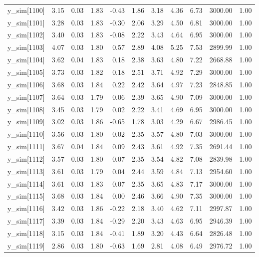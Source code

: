 \begin{table}[ht]
\begin{tabular}{rrrrrrrrrrr}
  y\_sim[1100] & 3.15 & 0.03 & 1.83 & -0.43 & 1.86 & 3.18 & 4.36 & 6.73 & 3000.00 & 1.00 \\ 
  y\_sim[1101] & 3.28 & 0.03 & 1.83 & -0.30 & 2.06 & 3.29 & 4.50 & 6.81 & 3000.00 & 1.00 \\ 
  y\_sim[1102] & 3.40 & 0.03 & 1.83 & -0.08 & 2.22 & 3.43 & 4.64 & 6.95 & 3000.00 & 1.00 \\ 
  y\_sim[1103] & 4.07 & 0.03 & 1.80 & 0.57 & 2.89 & 4.08 & 5.25 & 7.53 & 2899.99 & 1.00 \\ 
  y\_sim[1104] & 3.62 & 0.04 & 1.83 & 0.18 & 2.38 & 3.63 & 4.80 & 7.22 & 2668.88 & 1.00 \\ 
  y\_sim[1105] & 3.73 & 0.03 & 1.82 & 0.18 & 2.51 & 3.71 & 4.92 & 7.29 & 3000.00 & 1.00 \\ 
  y\_sim[1106] & 3.68 & 0.03 & 1.84 & 0.22 & 2.42 & 3.64 & 4.97 & 7.23 & 2848.85 & 1.00 \\ 
  y\_sim[1107] & 3.64 & 0.03 & 1.79 & 0.06 & 2.39 & 3.65 & 4.90 & 7.09 & 3000.00 & 1.00 \\ 
  y\_sim[1108] & 3.45 & 0.03 & 1.79 & 0.02 & 2.22 & 3.41 & 4.69 & 6.95 & 3000.00 & 1.00 \\ 
  y\_sim[1109] & 3.02 & 0.03 & 1.86 & -0.65 & 1.78 & 3.03 & 4.29 & 6.67 & 2986.45 & 1.00 \\ 
  y\_sim[1110] & 3.56 & 0.03 & 1.80 & 0.02 & 2.35 & 3.57 & 4.80 & 7.03 & 3000.00 & 1.00 \\ 
  y\_sim[1111] & 3.67 & 0.04 & 1.84 & 0.09 & 2.43 & 3.61 & 4.92 & 7.35 & 2691.44 & 1.00 \\ 
  y\_sim[1112] & 3.57 & 0.03 & 1.80 & 0.07 & 2.35 & 3.54 & 4.82 & 7.08 & 2839.98 & 1.00 \\ 
  y\_sim[1113] & 3.61 & 0.03 & 1.79 & 0.04 & 2.44 & 3.59 & 4.84 & 7.13 & 2954.60 & 1.00 \\ 
  y\_sim[1114] & 3.61 & 0.03 & 1.83 & 0.07 & 2.35 & 3.65 & 4.83 & 7.17 & 3000.00 & 1.00 \\ 
  y\_sim[1115] & 3.68 & 0.03 & 1.84 & 0.00 & 2.46 & 3.66 & 4.90 & 7.35 & 3000.00 & 1.00 \\ 
  y\_sim[1116] & 3.42 & 0.03 & 1.86 & -0.22 & 2.18 & 3.40 & 4.62 & 7.11 & 2997.87 & 1.00 \\ 
  y\_sim[1117] & 3.39 & 0.03 & 1.84 & -0.29 & 2.20 & 3.43 & 4.63 & 6.95 & 2946.39 & 1.00 \\ 
  y\_sim[1118] & 3.15 & 0.03 & 1.84 & -0.41 & 1.89 & 3.20 & 4.43 & 6.64 & 2826.48 & 1.00 \\ 
  y\_sim[1119] & 2.86 & 0.03 & 1.80 & -0.63 & 1.69 & 2.81 & 4.08 & 6.49 & 2976.72 & 1.00 \\ 

\end{tabular}
\end{table}
